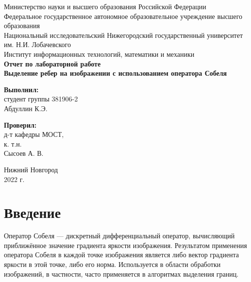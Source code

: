 \documentclass[12pt]{article}
\begin{document}
\begin{titlepage}

\begin{center}
Министерство науки и высшего образования Российской Федерации\\ 
\vspace{3mm}
Федеральное государственное автономное образовательное учреждение высшего образования\\
Национальный исследовательский Нижегородский государственный университет им. Н.И. Лобачевского\\
\vspace{0.8cm}
Институт информационных технологий, математики и механики\\
\vspace{3cm}
\textbf{\large Отчет по лабораторной работе}\\
\vspace{6mm}
\textbf{\Large Выделение ребер на изображении с использованием оператора Собеля} \\

\end{center}
\vspace{2cm}
\newlength{\ML}

\begin{flushright}
\textbf{ Выполнил:}\\
студент группы 381906-2\\
Абдуллин К.Э.\\
\end{flushright}
\begin{flushright}
\textbf{Проверил:}\\
д-т кафедры МОСТ,\\
к. т.н.\\
Сысоев А. В. \\
\end{flushright}
\vfill 
\begin{center}
 Нижний Новгород\\
 2022 г.
\end{center}
\end{titlepage}
\setcounter{page}{2}
\tableofcontents
\newpage 

\section*{Введение}
Оператор Собеля — дискретный дифференциальный оператор, вычисляющий приближённое значение градиента яркости изображения. Результатом применения оператора Собеля в каждой точке изображения является либо вектор градиента яркости в этой точке, либо его норма. Используется в области обработки изображений, в частности, часто применяется в алгоритмах выделения границ.
\end{document}
